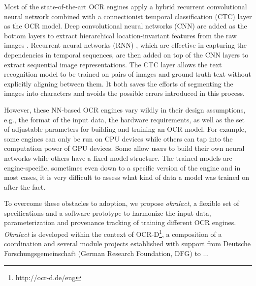 \documentclass[conference]{IEEEtran}
\begin{document}
Most of the state-of-the-art OCR engines apply a hybrid recurrent convolutional
neural network combined with a connectionist temporal classification (CTC)
\cite{graves2006connectionist} layer as the OCR model. Deep convolutional
neural networks (CNN) \cite{krizhevsky2012imagenet} are added as the bottom
layers to extract hierarchical location-invariant features from the raw images
\cite{wick2018improving}. Recurrent neural networks (RNN)
\cite{mikolov2010recurrent}, which are effective in capturing the dependencies
in temporal sequences, are then added on top of the CNN layers to extract
sequential image representations. The CTC layer allows the text recognition
model to be trained on pairs of images and ground truth text without explicitly
aligning between them. It both saves the efforts of segmenting the images into
characters and avoids the possible errors introduced in this process.



However, these NN-based OCR engines vary wildly in their design
assumptions, e.g., the format of the input data, the hardware
requirements, as well as the set of adjustable parameters for
building and training an OCR model. For example, some engines can
only be run on CPU devices while others can tap into the
computation power of GPU devices. Some allow users to build their
own neural networks while others have a fixed model structure. The
trained models are engine-specific, sometimes even down to a specific
version of the engine and in most cases, it is very difficult to
assess what kind of data a model was trained on after the fact.

To overcome these obstacles to adoption, we propose
\textit{okralact}, a flexible set of specifications and a software
prototype to harmonize the input data, parameterization and
provenance tracking of training different OCR engines.
\textit{Okralact} is developed within the context of
OCR-D\footnote{http://ocr-d.de/eng}, a composition of a
coordination and several module projects established with support
from Deutsche Forschungsgemeinschaft (German Research Foundation,
DFG) to ...
\end{document}
